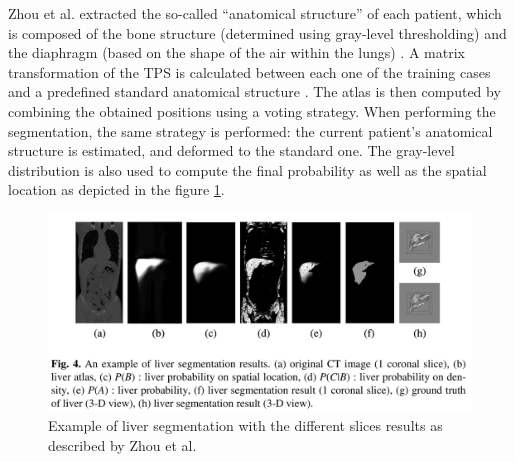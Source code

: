 \documentclass[]{article}
\begin{document}
	
	Zhou et al. extracted the so-called ``anatomical structure'' of each
	patient, which is composed of the bone structure (determined using
	gray-level thresholding) and the diaphragm (based on the shape of the
	air within the lungs) \cite{Zhou2006}. A matrix transformation of the TPS is calculated
	between each one of the training cases and a predefined standard
	anatomical structure \cite{Zhou2005}.
	The atlas is then computed by combining the obtained positions using a
	voting strategy. When performing the segmentation, the same strategy is
	performed: the current patient's anatomical structure is estimated, and
	deformed to the standard one. The gray-level distribution is also used
	to compute the final probability as well as the spatial location as
	depicted in the figure \ref{Zhou2006_Fig4}.
	\begin{figure}[th!]
		\centering
		\includegraphics[width=0.7\linewidth]{images/image31}
		\caption{Example of liver segmentation with the different slices results as described by Zhou et al. \cite{Zhou2006}}
		\label{Zhou2006_Fig4}
	\end{figure}
	
\end{document}
